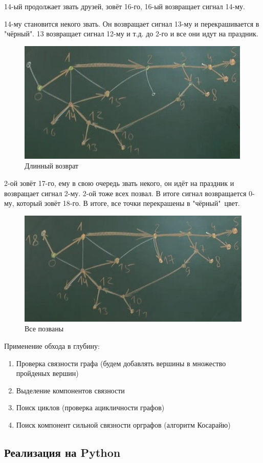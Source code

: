 \documentclass[a4paper,12pt]{article}
\theoremstyle{plain} %
\theoremstyle{definition} %
\theoremstyle{remark} %
\newcounter{num}
\begin{document}
14-ый продолжает звать друзей, зовёт 16-го, 16-ый возвращает сигнал 14-му.

14-му становится некого звать. Он возвращает сигнал 13-му и перекрашивается в "чёрный". 13 возвращает сигнал 12-му и т.д. до 2-го и все они идут на праздник.

\begin{figure}[h!]
	\centering
	\includegraphics[width=0.5\linewidth]{alg8}
	\caption{Длинный возврат}
\end{figure}

2-ой зовёт 17-го, ему в свою очередь звать некого, он идёт на праздник и возвращает сигнал 2-му. 2-ой тоже всех позвал. В итоге сигнал возвращается 0-му, который зовёт 18-го. В итоге, все точки перекрашены в "чёрный"\ цвет. 
\vspace{10cm}
\begin{figure}[h!]
	\centering
	\includegraphics[width=0.5\linewidth]{alg9}
	\caption{Все позваны}
\end{figure}

Применение обхода в глубину:
\begin{enumerate}
	\item Проверка связности графа (будем добавлять вершины в множество пройденых вершин)
	\item Выделение компонентов связности
	\item Поиск циклов (проверка ацикличности графов)
	\item Поиск компонент сильной связности орграфов (алгоритм Косарайю)
\end{enumerate}

\subsection{Реализация на Python}
\end{document}
